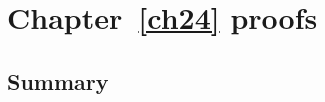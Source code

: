 \chapter{Chapter~\ref{ch24} proofs}

\newpage
\section{Summary}\label{ch24.ps.summary}
\lpscriptsummary
